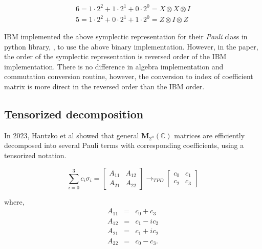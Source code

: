 \documentclass[twocolumn]{article}
\begin{document}
\begin{equation}
    \begin{array}{c}
        6 = 1 \cdot 2^2 +1 \cdot 2^1 + 0 \cdot 2^0 = X \otimes X \otimes I\\
        5 = 1 \cdot 2^2 +0 \cdot 2^1 + 1 \cdot 2^0 = Z \otimes I \otimes Z
    \end{array}
\end{equation}


IBM implemented the above symplectic representation 
for their \textit{Pauli} class in python library, ,
to use the above binary implementation\cite{Qiskit}. 
However, in the paper, the order of the symplectic representation 
is reversed order of the IBM implementation. 
There is no difference in algebra implementation and 
commutation conversion routine, however, the conversion to index of coefficient
matrix is more direct in the reversed order than the IBM order.

\subsection{Tensorized decomposition}

In 2023, Hantzko et al showed that 
general $\mathbf{M}_{2^n}(\mathbb{C})$ matrices are efficiently decomposed into 
several Pauli terms with corresponding coefficients, using a tensorized notation\cite{hantzko_tensorized_2023}.

\begin{equation}
    \sum_{i=0}^3 c_i \sigma_i = 
    \begin{bmatrix}
        A_{11} & A_{12}\\
        A_{21} & A_{22}
    \end{bmatrix}
    \rightarrow_{TPD}
    \begin{bmatrix}
        c_0 & c_1\\
        c_2 & c_3
    \end{bmatrix}
\end{equation}

where, 
\begin{equation}
    \label{eq:tpd_transform}
    \begin{array}{ccc}
        A_{11} & = &  c_0 + c_3\\
        A_{12} & = &  c_1 - i c_2\\
        A_{21} & = &  c_1 + i c_2\\
        A_{22} & = &  c_0 - c_3.
    \end{array}
\end{equation}
\end{document}
